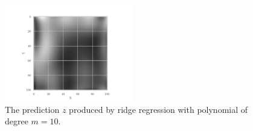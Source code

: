 \begin{figure}[htbp]
	\centering
	\includegraphics[width=0.5\textwidth]{../figures/terrainpicture_ridge}
	\caption{The prediction $z$ produced by ridge regression with polynomial of degree $m=10$.}
	\label{fig:terrainpic_ridge}
\end{figure}

